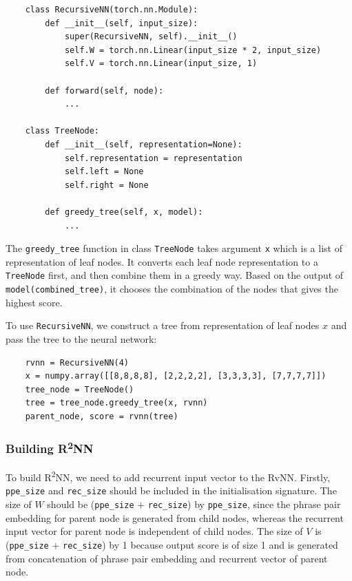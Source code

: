 \documentclass[12pt,a4paper,twoside,openright]{report}
\begin{document}
\begin{verbatim}
    class RecursiveNN(torch.nn.Module):
        def __init__(self, input_size):
            super(RecursiveNN, self).__init__()
            self.W = torch.nn.Linear(input_size * 2, input_size)
            self.V = torch.nn.Linear(input_size, 1)
    
        def forward(self, node):
            ...
    
    class TreeNode:
        def __init__(self, representation=None):
            self.representation = representation
            self.left = None
            self.right = None
    
        def greedy_tree(self, x, model):
            ...
\end{verbatim}

The \texttt{greedy\_tree} function in class \texttt{TreeNode} takes argument \texttt{x} which is a list of representation of leaf nodes. It converts each leaf node representation to a \texttt{TreeNode} first, and then combine them in a greedy way. Based on the output of \texttt{model(combined\_tree)}, it chooses the combination of the nodes that gives the highest score.

To use \texttt{RecursiveNN}, we construct a tree from representation of leaf nodes $x$ and pass the tree to the neural network:

\begin{verbatim}
    rvnn = RecursiveNN(4)
    x = numpy.array([[8,8,8,8], [2,2,2,2], [3,3,3,3], [7,7,7,7]])
    tree_node = TreeNode()
    tree = tree_node.greedy_tree(x, rvnn)
    parent_node, score = rvnn(tree)
\end{verbatim}


\subsubsection{Building \texorpdfstring{R\textsuperscript{2}NN}{R2NN}}
To build R\textsuperscript{2}NN, we need to add recurrent input vector to the RvNN. Firstly, \texttt{ppe\_size} and \texttt{rec\_size} should be included in the initialisation signature. The size of $W$ should be (\texttt{ppe\_size} $+$ \texttt{rec\_size}) by \texttt{ppe\_size}, since the phrase pair embedding for parent node is generated from child nodes, whereas the recurrent input vector for parent node is independent of child nodes. The size of $V$ is (\texttt{ppe\_size} $+$ \texttt{rec\_size}) by 1 because output score is of size 1 and is generated from concatenation of phrase pair embedding and recurrent vector of parent node.
\end{document}
